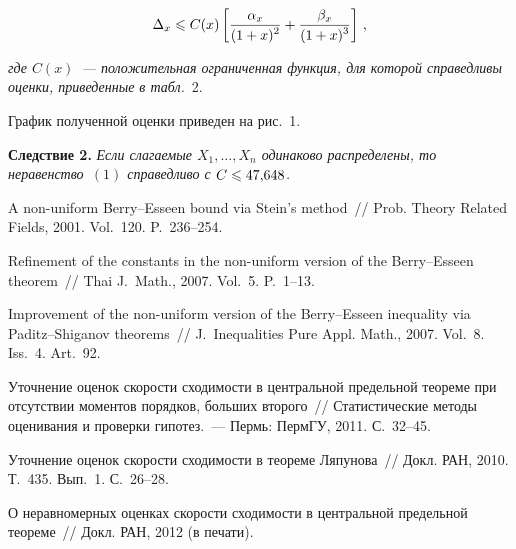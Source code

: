 \begin{multicols}{2}

\noindent
$$
\Delta_x\leqslant
C(x)\left[\displaystyle\frac{\displaystyle \alpha_x\mathstrut}{\displaystyle (1+x)^2\mathstrut}+\displaystyle\frac{\displaystyle \beta_x\mathstrut}{\displaystyle (1+x)^3\mathstrut}\right]\,,
$$

\noindent
\textit{где $C(x)$~--- положительная ограниченная функция, для которой
справедливы оценки, приведенные в табл.}~2.


\smallskip

График полученной оценки приведен на рис.~1.

\smallskip

\noindent
\textbf{Следствие 2.} \textit{Если слагаемые $X_1,\ldots,X_n$ одинаково распределены, то
неравенство~$(1)$ справедливо с $C\hm\leqslant 47{,}648$.
}


{\small\frenchspacing
{%
\begin{thebibliography}{9}


 A non-uniform Berry--Esseen bound
via Stein's method~// Prob. Theory Related Fields, 2001.
Vol.~120. P.~236--254.

 Refinement of the constants in the
non-uniform version of the Berry--Esseen theorem~// Thai J.~Math., 2007. Vol.~5. P.~1--13.

 Improvement of the non-uniform
version of the Berry--Esseen inequality via Paditz--Shiganov
theorems~// J.~Inequalities Pure Appl.
Math., 2007. Vol.~8. Iss.~4. Art.~92.

 Уточнение оценок ско\-рости
сходимости в центральной предельной теореме при отсутствии моментов
порядков, больших второго~// Статистические методы оценивания и
проверки гипотез.~--- Пермь: ПермГУ, 2011. С.~32--45.

 Уточнение оценок скорости схо\-ди\-мости в теореме
Ляпунова~// Докл. РАН, 2010. Т.~435. Вып.~1. С.~26--28.

\label{end\stat}
 О неравномерных оценках
скорости сходимости в центральной предельной теореме~// Докл.
РАН, 2012 (в печати).

 \end{thebibliography}
}
}


\end{multicols}       